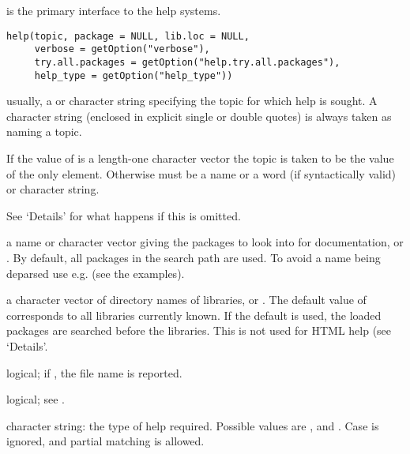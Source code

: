 %
\begin{Description}\relax
{} is the primary interface to the help systems.
\end{Description}
%
\begin{Usage}
\begin{verbatim}
help(topic, package = NULL, lib.loc = NULL,
     verbose = getOption("verbose"),
     try.all.packages = getOption("help.try.all.packages"),
     help_type = getOption("help_type"))
\end{verbatim}
\end{Usage}
%
\begin{Arguments}
\begin{ldescription}
\item[\code{topic}] usually, a  or character string specifying the
topic for which help is sought.  A character string (enclosed in
explicit single or double quotes) is always taken as naming a topic.

If the value of  is a length-one
character vector the topic is taken to be the value of the only
element.  Otherwise  must be a name or a 
word (if syntactically valid) or character string.

See `Details' for what happens if this is omitted.

\item[\code{package}] a name or character vector giving the packages to look
into for documentation, or .  By default, all packages in
the search path are used.  To avoid a name being deparsed use e.g.
 (see the examples).
\item[\code{lib.loc}] a character vector of directory names of \R{} libraries,
or .  The default value of  corresponds to all
libraries currently known.  If the default is used, the loaded
packages are searched before the libraries.  This is not used for
HTML help (see `Details'.
\item[\code{verbose}] logical; if , the file name is reported.
\item[\code{try.all.packages}] logical; see .
\item[\code{help\_type}] character string: the type of help required.
Possible values are ,  and .
Case is ignored, and partial matching is allowed.
\end{ldescription}
\end{Arguments}
